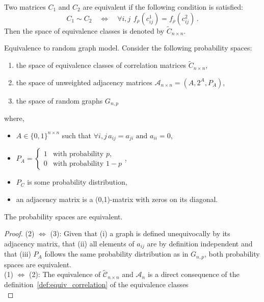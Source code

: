 \begin{definition}
\label{def:equiv_correlation}
Two matrices $C_1$ and $C_2$ are equivalent if the following condition is satisfied:
\begin{equation}C_1\sim C_2\quad \Leftrightarrow \quad \forall i,j \,\ f_{\rho}(c^1_{ij}) = f_{\rho}(c^2_{ij})\,.\end{equation}
Then the space of equivalence classes is denoted by $\widetilde{C}_{n\times n}$. 
\end{definition}



\begin{theorem}{Equivalence to random graph model.}
\label{thm:equivalence_random_graph_model}
Consider the following probability spaces:
\begin{enumerate}
	\item the space of equivalence classes of correlation matrices $\widetilde{C}_{n\times n}$,
	\item the space of unweighted adjacency matrices $\mathcal{A}_{n\times n} = \left( A, 2^A, P_A \right)$,
	\item the space of random graphs $G_{n,p}$
\end{enumerate}
\noindent where,
\begin{itemize}
	\item[] $A \in \{0,1\}^{n \times n}$ such that $\forall i,j\,  a_{ij} = a_{ji} \text{ and } a_{ii} = 0$,
	\item[] $P_A = \begin{cases} 1 & \text{with probability } p,\\0 & \text{with probability } 1-p\end{cases}$,
	\item[] $P_C$ is some probability distribution,
	\item[] an adjacency matrix is a (0,1)-matrix with zeros on its diagonal.
\end{itemize}
The probability spaces are equivalent.
\end{theorem}

\begin{proof}

(2) $\Leftrightarrow$ (3):
Given that (i) a graph is defined unequivocally by its adjacency matrix, that (ii) all elements of $a_{ij}$ are by definition independent and that (iii) $P_A$ follows the same probability distribution as in $G_{n,p}$, both probability spaces are equivalent.
\\
(1) $\Leftrightarrow$ (2):
The equivalence of $\widetilde{\mathcal{C}}_{n\times n}$ and $\mathcal{A}_n$ is a direct consequence of the definition~\ref{def:equiv_correlation} of the equivalence classes \\
\end{proof}

